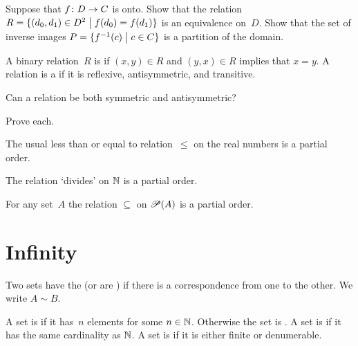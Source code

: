 \documentclass{ibl}
\begin{document}
\begin{ex}
Suppose that $\mbox{$f\colon D\to C$}$ is onto.
Show that the relation
$R=\{(d_0,d_1)\in D^2 \bigm| f(d_0)=f(d_1)\}$ 
is an equivalence on~$D$. 
Show that the set of inverse images 
$P=\{f^{-1}(c) \bigm| c\in C\}$ is a partition of the domain.
\end{ex}

\begin{df}
A binary relation~$R$ is  if
$(x,y)\in R$ and $(y,x)\in R$ implies that $x=y$.
A relation is a  if it is 
reflexive, antisymmetric, and transitive.  
\end{df}

\begin{ex}
Can a relation be both symmetric and antisymmetric?  
\end{ex}

\begin{ex} Prove each.
\begin{exes}
\item The usual less than or equal to relation~$\leq$ on 
the real numbers is a partial order.
\item The relation `divides' on $\mathbb{N}$ is a partial order.
\item For any set~$A$ the relation $\subseteq$ on $\mathscr{P}(A)$ is
a partial order.
\end{exes}
\end{ex}





\chapter{Infinity}

\begin{df}
Two sets have the  
(or are ) if there is a 
correspondence from one to the other.
We write $A\sim B$.   
\end{df}

\begin{df}
A set is  if it has~$n$ elements for some $n\in\mathbb{N}$.
Otherwise the set is .   
A set is  if it has the same cardinality 
as $\mathbb{N}$.
A set is  if it is either finite or denumerable.
\end{df}
\end{document}
